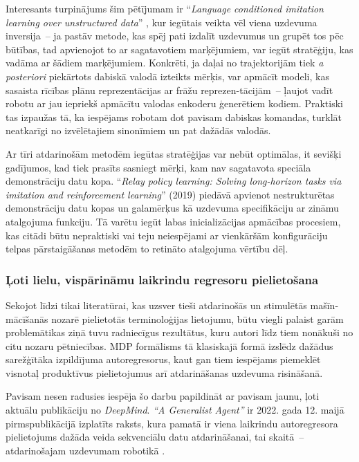 \documentclass[12pt, a4paper]{article}
\numberwithin{equation}{section} %
\begin{document}
Interesants turpinājums šim pētījumam ir ``\textit{Language conditioned imitation learning over unstructured data}'' \cite{lynch2021language}, kur iegūtais veikta vēl viena uzdevuma inversija~-- ja pastāv metode, kas spēj pati izdalīt uzdevumus un grupēt tos pēc būtības, tad apvienojot to ar sagatavotiem marķējumiem, var iegūt stratēģiju, kas vadāma ar šādiem marķējumiem. Konkrēti, ja daļai no trajektorijām tiek \textit{a posteriori} piekārtots dabiskā valodā izteikts mērķis, var apmācīt modeli, kas sasaista rīcības plānu reprezentācijas ar frāžu reprezen-tācijām~-- ļaujot vadīt robotu ar jau iepriekš apmācītu valodas enkoderu ģenerētiem kodiem. Praktiski tas izpaužas tā, ka iespējams robotam dot pavisam dabiskas komandas, turklāt neatkarīgi no izvēlētajiem sinonīmiem un pat dažādās valodās.

Ar tīri atdarinošām metodēm iegūtas stratēģijas var nebūt optimālas, it sevišķi gadījumos, kad tiek prasīts sasniegt mērķi, kam nav sagatavota speciāla demonstrāciju datu kopa. ``\textit{Relay policy learning: Solving long-horizon tasks via imitation and reinforcement learning}'' \cite{gupta2019relay} (2019) piedāvā apvienot nestrukturētas demonstrāciju datu kopas un galamērķus kā uzdevuma specifikāciju ar zināmu atalgojuma funkciju. Tā varētu iegūt labas inicializācijas apmācības procesiem, kas citādi būtu nepraktiski vai teju neiespējami ar vienkāršām konfigurāciju telpas pārstaigāšanas metodēm to retināto atalgojuma vērtību dēļ.

\subsubsection{Ļoti lielu, vispārināmu laikrindu regresoru pielietošana}

Sekojot līdzi tikai literatūrai, kas uzsver tieši atdarinošās un stimulētās mašīn-mācīšanās nozarē pielietotās terminoloģijas lietojumu, būtu viegli palaist garām problemātikas ziņā tuvu radniecīgus rezultātus, kuru autori līdz tiem nonākuši no citu nozaru pētniecības. MDP formālisms tā klasiskajā formā izslēdz dažādus sarežģītāka izpildījuma autoregresorus, kaut gan tiem iespējams piemeklēt visnotaļ produktīvus pielietojumus arī atdarināšanas uzdevuma risināšanā.

Pavisam nesen radusies iespēja šo darbu papildināt ar pavisam jaunu, ļoti aktuālu publikāciju no \textit{DeepMind}. \textit{``A Generalist Agent''} ir 2022. gada 12. maijā pirmspublikācijā izplatīts raksts, kura pamatā ir viena laikrindu autoregresora pielietojums dažāda veida sekvenciālu datu atdarināšanai, tai skaitā~-- atdarinošajam uzdevumam robotikā \cite{reed2022generalist}.
\end{document}
